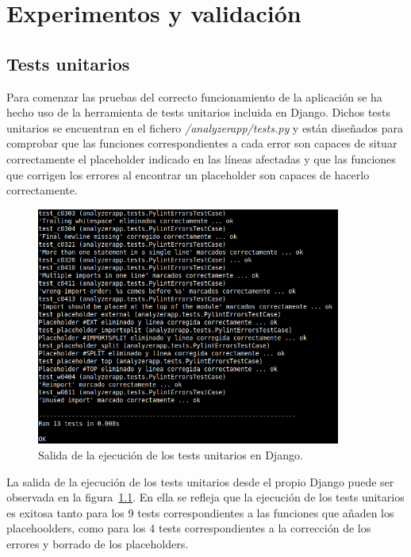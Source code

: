 \documentclass[a4paper, 12pt]{book}
\begin{document}

\cleardoublepage
\chapter{Experimentos y validación}

\section{Tests unitarios}
\label{sec:tests}
Para comenzar las pruebas del correcto funcionamiento de la aplicación se ha hecho uso de la herramienta de tests unitarios incluida en Django.
Dichos tests unitarios se encuentran en el fichero \textit{/analyzerapp/tests.py} y están diseñados para comprobar que las funciones correspondientes a cada error son capaces de situar correctamente el placeholder indicado en las líneas afectadas y que las funciones que corrigen los errores al encontrar un placeholder son capaces de hacerlo correctamente.
\begin{figure}[h]
  \centering
  \includegraphics[width=10cm, keepaspectratio]{img/tests.png}
  \caption{Salida de la ejecución de los tests unitarios en Django.}\label{fig:tests}
\end{figure}

La salida de la ejecución de los tests unitarios desde el propio Django puede ser observada en la figura~\ref{fig:tests}. En ella se refleja que la ejecución de los tests unitarios es exitosa tanto para los 9 tests correspondientes a las funciones que añaden los placehoolders, como para los 4 tests correspondientes a la corrección de los errores y borrado de los placeholders.
\end{document}
